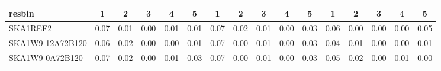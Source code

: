 \begin{table}[!htp]
{{\begin{tabular}{|lccccc||ccccc||ccccc|}
 resbin  &1 & 2 & 3 & 4 & 5 & 1 & 2 & 3 & 4 & 5 & 1 & 2 & 3 & 4 & 5 \\ \hline
SKA1REF2 & 0.07 \cellcolor{blue!60.00} & 0.01 \cellcolor{red!18.00} & 0.00 \cellcolor{green!18.00} & 0.01 \cellcolor{orange!60.00} & 0.01 \cellcolor{purple!18.00} & 0.07 \cellcolor{blue!18.00} & 0.02 \cellcolor{red!60.00} & 0.01 \cellcolor{green!18.00} & 0.00 \cellcolor{orange!18.00} & 0.03 \cellcolor{purple!18.00} & 0.06 \cellcolor{blue!60.00} & 0.00 \cellcolor{red!18.00} & 0.00 \cellcolor{green!18.00} & 0.00 \cellcolor{orange!18.00} & 0.05 \cellcolor{purple!60.00}\\ \hline 
SKA1W9-12A72B120 & 0.06 \cellcolor{blue!18.00} & 0.02 \cellcolor{red!60.00} & 0.00 \cellcolor{green!18.00} & 0.00 \cellcolor{orange!18.00} & 0.01 \cellcolor{purple!18.00} & 0.07 \cellcolor{blue!18.00} & 0.00 \cellcolor{red!18.00} & 0.01 \cellcolor{green!18.00} & 0.00 \cellcolor{orange!18.00} & 0.03 \cellcolor{purple!18.00} & 0.04 \cellcolor{blue!18.00} & 0.01 \cellcolor{red!39.00} & 0.00 \cellcolor{green!18.00} & 0.00 \cellcolor{orange!18.00} & 0.01 \cellcolor{purple!26.40}\\ \hline 
SKA1W9-0A72B120 & 0.07 \cellcolor{blue!60.00} & 0.02 \cellcolor{red!60.00} & 0.00 \cellcolor{green!18.00} & 0.01 \cellcolor{orange!60.00} & 0.03 \cellcolor{purple!60.00} & 0.07 \cellcolor{blue!18.00} & 0.00 \cellcolor{red!18.00} & 0.01 \cellcolor{green!18.00} & 0.00 \cellcolor{orange!18.00} & 0.03 \cellcolor{purple!18.00} & 0.05 \cellcolor{blue!39.00} & 0.02 \cellcolor{red!60.00} & 0.00 \cellcolor{green!18.00} & 0.01 \cellcolor{orange!60.00} & 0.00 \cellcolor{purple!18.00}\\ \hline 
\end{tabular}}
\hspace{1cm} 
}
\end{table}
